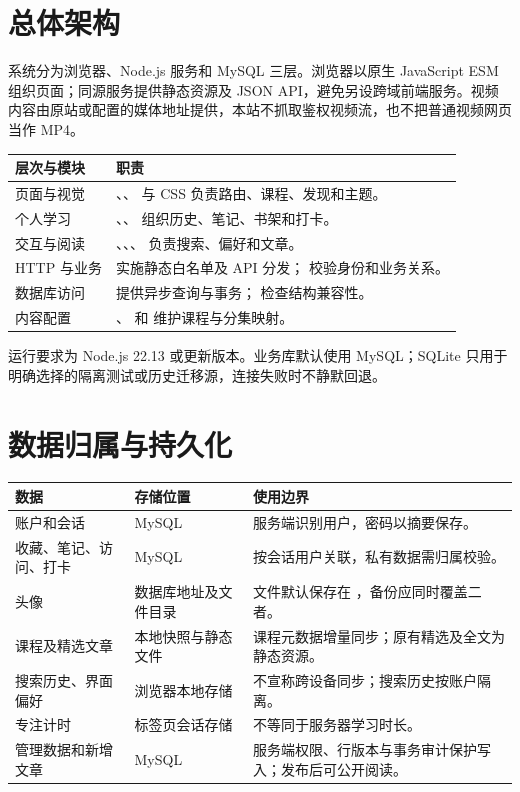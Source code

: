 \documentclass[UTF8,12pt,a4paper,openany,oneside]{ctexbook}
\begin{document}
\section{总体架构}
系统分为浏览器、Node.js 服务和 MySQL 三层。浏览器以原生 JavaScript ESM 组织页面；同源服务提供静态资源及 JSON API，避免另设跨域前端服务。视频内容由原站或配置的媒体地址提供，本站不抓取鉴权视频流，也不把普通视频网页当作 MP4。
{\small
\begin{longtable}{P{0.25\textwidth}P{0.61\textwidth}}
\toprule 层次与模块 & 职责 \\ \midrule
页面与视觉 & 、、 与 CSS 负责路由、课程、发现和主题。 \\
个人学习 & 、、 组织历史、笔记、书架和打卡。 \\
交互与阅读 & 、、、 负责搜索、偏好和文章。 \\
HTTP 与业务 &  实施静态白名单及 API 分发； 校验身份和业务关系。 \\
数据库访问 &  提供异步查询与事务； 检查结构兼容性。 \\
内容配置 & 、 和  维护课程与分集映射。 \\
\bottomrule
\end{longtable}}
运行要求为 Node.js 22.13 或更新版本。业务库默认使用 MySQL；SQLite 只用于明确选择的隔离测试或历史迁移源，连接失败时不静默回退。

\section{数据归属与持久化}
{\small
\begin{longtable}{P{0.23\textwidth}P{0.22\textwidth}P{0.42\textwidth}}
\toprule 数据 & 存储位置 & 使用边界 \\ \midrule
账户和会话 & MySQL & 服务端识别用户，密码以摘要保存。 \\
收藏、笔记、访问、打卡 & MySQL & 按会话用户关联，私有数据需归属校验。 \\
头像 & 数据库地址及文件目录 & 文件默认保存在 ，备份应同时覆盖二者。 \\
课程及精选文章 & 本地快照与静态文件 & 课程元数据增量同步；原有精选及全文为静态资源。 \\
搜索历史、界面偏好 & 浏览器本地存储 & 不宣称跨设备同步；搜索历史按账户隔离。 \\
专注计时 & 标签页会话存储 & 不等同于服务器学习时长。 \\
管理数据和新增文章 & MySQL & 服务端权限、行版本与事务审计保护写入；发布后可公开阅读。 \\
\bottomrule
\end{longtable}}
\end{document}

